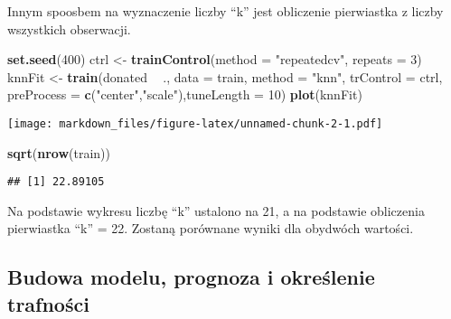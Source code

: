 \documentclass[]{article}
\newenvironment{Shaded}{\begin{snugshade}}{\end{snugshade}}
\newcommand{\KeywordTok}[1]{\textcolor[rgb]{0.13,0.29,0.53}{\textbf{#1}}}
\newcommand{\DataTypeTok}[1]{\textcolor[rgb]{0.13,0.29,0.53}{#1}}
\newcommand{\DecValTok}[1]{\textcolor[rgb]{0.00,0.00,0.81}{#1}}
\newcommand{\StringTok}[1]{\textcolor[rgb]{0.31,0.60,0.02}{#1}}
\newcommand{\OperatorTok}[1]{\textcolor[rgb]{0.81,0.36,0.00}{\textbf{#1}}}
\newcommand{\NormalTok}[1]{#1}
\begin{document}
Innym spoosbem na wyznaczenie liczby ``k'' jest obliczenie pierwiastka z
liczby wszystkich obserwacji.

\begin{Shaded}
\begin{Highlighting}[]
\KeywordTok{set.seed}\NormalTok{(}\DecValTok{400}\NormalTok{)}
\NormalTok{ctrl <-}\StringTok{ }\KeywordTok{trainControl}\NormalTok{(}\DataTypeTok{method =} \StringTok{"repeatedcv"}\NormalTok{, }\DataTypeTok{repeats =} \DecValTok{3}\NormalTok{)}
\NormalTok{knnFit <-}\StringTok{ }\KeywordTok{train}\NormalTok{(donated }\OperatorTok{~}\StringTok{ }\NormalTok{., }\DataTypeTok{data =}\NormalTok{ train, }\DataTypeTok{method =} \StringTok{"knn"}\NormalTok{, }\DataTypeTok{trControl =}\NormalTok{ ctrl, }\DataTypeTok{preProcess =} \KeywordTok{c}\NormalTok{(}\StringTok{"center"}\NormalTok{,}\StringTok{"scale"}\NormalTok{),}\DataTypeTok{tuneLength =} \DecValTok{10}\NormalTok{)}
\KeywordTok{plot}\NormalTok{(knnFit)}
\end{Highlighting}
\end{Shaded}

\texttt{[image: markdown\_files/figure-latex/unnamed-chunk-2-1.pdf]}

\begin{Shaded}
\begin{Highlighting}[]
\KeywordTok{sqrt}\NormalTok{(}\KeywordTok{nrow}\NormalTok{(train))}
\end{Highlighting}
\end{Shaded}

\begin{verbatim}
## [1] 22.89105
\end{verbatim}

Na podstawie wykresu liczbę ``k'' ustalono na 21, a na podstawie
obliczenia pierwiastka ``k'' = 22. Zostaną porównane wyniki dla obydwóch
wartości.

\subsection{Budowa modelu, prognoza i określenie
trafności}\label{budowa-modelu-prognoza-i-okreslenie-trafnosci}

\begin{Shaded}
\end{Shaded}
\end{document}
